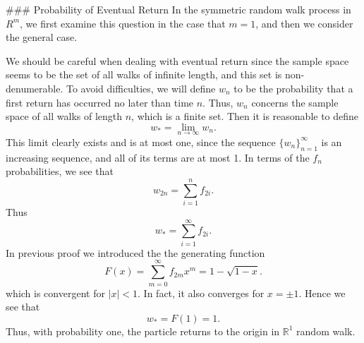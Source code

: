 ### Probability of Eventual Return
In the symmetric random walk process in $R^m$, we first examine this question in the case that $m = 1$, and then we consider the general case.

We should be careful when dealing with eventual return since the sample space seems to be the set of all walks of infinite length, and this set is non-denumerable. To avoid difficulties, we will define $w_n$ to be the probability that a first return has occurred no later than time $n$. Thus,
$w_n$ concerns the sample space of all walks of length $n$, which is a finite set. Then it is reasonable to define 
\begin{equation*}
    w_{*}=\lim _{n \rightarrow \infty} w_{n}.
\end{equation*}
This limit clearly exists and is at most one, since the sequence $\{w_n\}_{n=1}^\infty$ is an increasing sequence, and all of its terms are at most 1. In terms of the $f_n$ probabilities, we see that
\begin{equation*}
    w_{2 n}=\sum_{i=1}^{n} f_{2 i}.
\end{equation*}
Thus 
\begin{equation*}
    w_{*}=\sum_{i=1}^{\infty} f_{2 i}.
\end{equation*}
In previous proof we introduced the the generating function
\begin{equation*}
    F(x)=\sum_{m=0}^{\infty} f_{2 m} x^{m} = 1-\sqrt{1-x}.
\end{equation*}
which is convergent for $\left\vert x \right\vert < 1$. In fact, it also converges for $x = \pm 1$. Hence we see that 
\begin{equation*}
    w_{*}=F(1)=1.
\end{equation*}
Thus, with probability one, the particle returns to the origin in $\mathbb{R}^1$ random walk.

